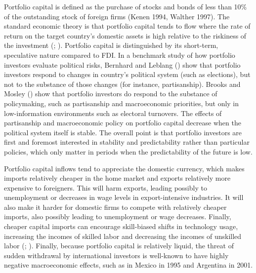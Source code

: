 \documentclass[12pt]{report}
\begin{document}
Portfolio capital is defined as the purchase of stocks and bonds of
less than 10\% of the outstanding stock of foreign firms (Kenen 1994,
Walther 1997). The standard economic theory is that portfolio capital
tends to flow where the rate of return on the target country's domestic
assets is high relative to the riskiness of the investment (\citealt[743]{mosley2003global};
\citealt[685]{ISQU:ISQU420}). Portfolio capital is distinguished
by its short-term, speculative nature compared to FDI. In a benchmark
study of how portfolio investors evaluate political risks, Bernhard
and Leblang (\citeyear{Bernhard:2002gy}) show that portfolio investors
respond to changes in country's political system (such as elections),
but not to the substance of those changes (for instance, partisanship).
Brooks and Mosley (\citeyear{Brooks:2007we}) show that portfolio
investors do respond to the substance of policymaking, such as partisanship
and macroeconomic priorities, but only in low-information environments
such as electoral turnovers. The effects of partisanship and macroeconomic
policy on portfolio capital decrease when the political system itself
is stable. The overall point is that portfolio investors are first
and foremost interested in stability and predictability rather than
particular policies, which only matter in periods when the predictability
of the future is low.

Portfolio capital inflows tend to appreciate the domestic currency,
which makes imports relatively cheaper in the home market and exports
relatively more expensive to foreigners. This will harm exports, leading
possibly to unemployment or decreases in wage levels in export-intensive
industries. It will also make it harder for domestic firms to compete
with relatively cheaper imports, also possibly leading to unemployment
or wage decreases. Finally, cheaper capital imports can encourage
skill-biased shifts in technology usage, increasing the incomes of
skilled labor and decreasing the incomes of unskilled labor (\citealt{Cragg:1996iy};
\citealt{Ros:2000vy}). Finally, because portfolio capital is relatively
liquid, the threat of sudden withdrawal by international investors
is well-known to have highly negative macroeconomic effects, such
as in Mexico in 1995 and Argentina in 2001.
\end{document}
